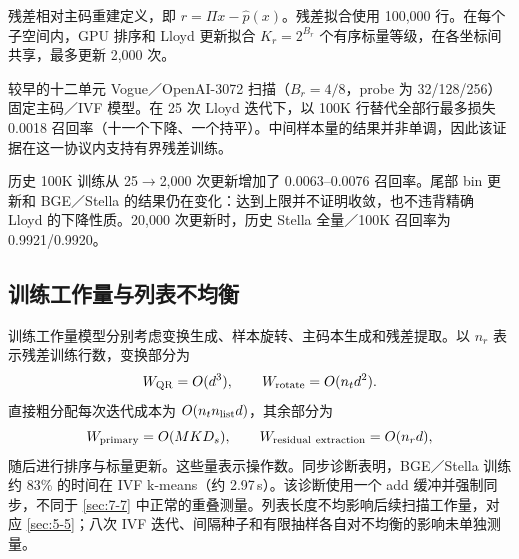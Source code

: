 残差相对主码重建定义，即 $r=\Pi x-\widehat p(x)$。残差拟合使用 100,000 行。在每个子空间内，GPU 排序和 Lloyd 更新拟合 $K_r=2^{B_r}$ 个有序标量等级，在各坐标间共享，最多更新 2,000 次。

较早的十二单元 Vogue／OpenAI-3072 扫描（$B_r=4/8$，probe 为 32/128/256）固定主码／IVF 模型。在 25 次 Lloyd 迭代下，以 100K 行替代全部行最多损失 0.0018 召回率（十一个下降、一个持平）。中间样本量的结果并非单调，因此该证据在这一协议内支持有界残差训练。

历史 100K 训练从 25$\to$2,000 次更新增加了 0.0063--0.0076 召回率。尾部 bin 更新和 BGE／Stella 的结果仍在变化：达到上限并不证明收敛，也不违背精确 Lloyd 的下降性质。20,000 次更新时，历史 Stella 全量／100K 召回率为 0.9921/0.9920。

\subsection{训练工作量与列表不均衡}

训练工作量模型分别考虑变换生成、样本旋转、主码本生成和残差提取。以 $n_r$ 表示残差训练行数，变换部分为
\[
 W_{\rm QR}=O(d^3),\qquad W_{\rm rotate}=O(n_t d^2).
\]
直接粗分配每次迭代成本为 $O(n_t n_{\rm list}d)$，其余部分为
\[
 W_{\rm primary}=O(MKD_s),\qquad
 W_{\rm residual\ extraction}=O(n_rd),
\]
随后进行排序与标量更新。这些量表示操作数。同步诊断表明，BGE／Stella 训练约 83\% 的时间在 IVF k-means（约 2.97\,s）。该诊断使用一个 add 缓冲并强制同步，不同于 \cref{sec:7-7} 中正常的重叠测量。列表长度不均影响后续扫描工作量，对应 \cref{sec:5-5}；八次 IVF 迭代、间隔种子和有限抽样各自对不均衡的影响未单独测量。
